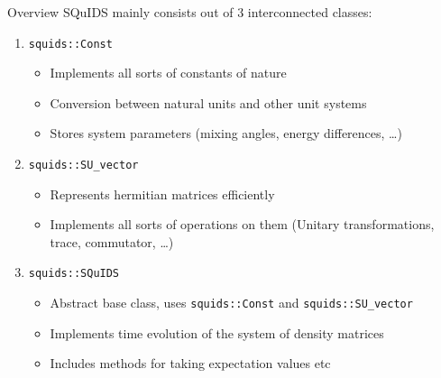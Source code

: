 \documentclass[]{beamer}
\begin{document}
\begin{frame}{Overview}
  SQuIDS mainly consists out of 3 interconnected classes:
  \begin{enumerate}
    \item<1-> \texttt{squids::Const}
    \begin{itemize}
      \item<1-> Implements all sorts of constants of nature
      \item<1-> Conversion between natural units and other unit systems
      \item<1-> Stores system parameters (mixing angles, energy differences, \ldots)
    \end{itemize} 
    \item<2-> \texttt{squids::SU\_vector}
    \begin{itemize}
      \item<2-> Represents hermitian matrices efficiently
      \item<2-> Implements all sorts of operations on them (Unitary transformations, trace, commutator, \ldots)
    \end{itemize}
    \item<3-> \texttt{squids::SQuIDS}
    \begin{itemize}
      \item<3-> Abstract base class, uses \texttt{squids::Const} and \texttt{squids::SU\_vector}
      \item<3-> Implements time evolution of the system of density matrices
      \item<3-> Includes methods for taking expectation values etc
    \end{itemize}
  \end{enumerate}
\end{frame}

\begin{frame}
\end{frame}
\end{document}

